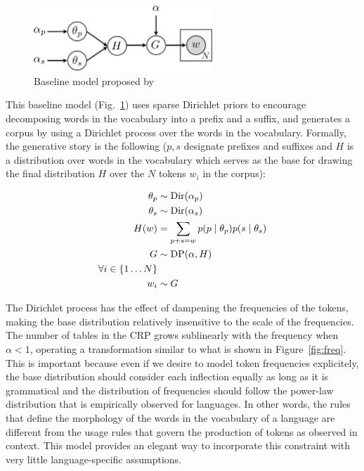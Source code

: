 \begin{figure}[h]
  \centering
  \includegraphics[width=0.6\textwidth]{fig/v1}
  \caption{Baseline model proposed by \cite{goldwater2011}}
  \label{fig:v1}
\end{figure}

This baseline model (Fig.~\ref{fig:v1}) uses sparse Dirichlet priors to encourage decomposing words in the vocabulary into a prefix and a suffix, and generates a corpus by using a Dirichlet process over the words in the vocabulary. Formally, the generative story is the following ($p,s$ designate prefixes and suffixes and $H$ is a distribution over words in the vocabulary which serves as the base for drawing the final distribution $H$ over the $N$ tokens $w_i$ in the corpus):

\begin{align*}
  \theta_p & \sim \mathrm{Dir}(\alpha_p) \\
  \theta_s & \sim \mathrm{Dir}(\alpha_s) \\
  H(w) & = \sum_{p+s=w} p(p \mid \theta_p) p(s \mid \theta_s) \\
  G & \sim \mathrm{DP}(\alpha, H) \\
  \forall i \in \{1 \dots N\} \\
  w_i & \sim G
\end{align*}

The Dirichlet process has the effect of dampening the frequencies of the tokens, making the base distribution relatively insensitive to the scale of the frequencies. The number of tables in the CRP grows sublinearly \cite{goldwater2011} with the frequency when $\alpha < 1$, operating a transformation similar to what is shown in Figure~\ref{fig:freq}. This is important because even if we desire to model token frequencies explicitely, the base distribution should consider each inflection equally as long as it is grammatical and the distribution of frequencies should follow the power-law distribution that is empirically observed for languages. In other words, the rules that define the morphology of the words in the vocabulary of a language are different from the usage rules that govern the production of tokens as observed in context. This model provides an elegant way to incorporate this constraint with very little language-specific assumptions.

